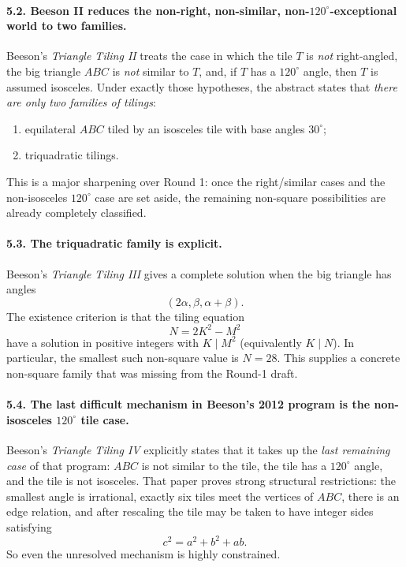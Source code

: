 \paragraph{5.2. Beeson II reduces the non-right, non-similar, non-$120^\circ$-exceptional world to two families.}
Beeson's \emph{Triangle Tiling II} treats the case in which the tile $T$ is \emph{not} right-angled, the big triangle $ABC$ is \emph{not} similar to $T$, and, if $T$ has a $120^\circ$ angle, then $T$ is assumed isosceles. Under exactly those hypotheses, the abstract states that \emph{there are only two families of tilings}: 
\begin{enumerate}
\item equilateral $ABC$ tiled by an isosceles tile with base angles $30^\circ$;
\item triquadratic tilings.
\end{enumerate}
This is a major sharpening over Round 1: once the right/similar cases and the non-isosceles $120^\circ$ case are set aside, the remaining non-square possibilities are already completely classified.

\paragraph{5.3. The triquadratic family is explicit.}
Beeson's \emph{Triangle Tiling III} gives a complete solution when the big triangle has angles
\[
(2\alpha,\beta,\alpha+\beta).
\]
The existence criterion is that the tiling equation
\[
N=2K^2-M^2
\]
have a solution in positive integers with $K\mid M^2$ (equivalently $K\mid N$). In particular, the smallest such non-square value is $N=28$. This supplies a concrete non-square family that was missing from the Round-1 draft.

\paragraph{5.4. The last difficult mechanism in Beeson's 2012 program is the non-isosceles $120^\circ$ tile case.}
Beeson's \emph{Triangle Tiling IV} explicitly states that it takes up the \emph{last remaining case} of that program: $ABC$ is not similar to the tile, the tile has a $120^\circ$ angle, and the tile is not isosceles. That paper proves strong structural restrictions: the smallest angle is irrational, exactly six tiles meet the vertices of $ABC$, there is an edge relation, and after rescaling the tile may be taken to have integer sides satisfying
\[
c^2=a^2+b^2+ab.
\]
So even the unresolved mechanism is highly constrained.

